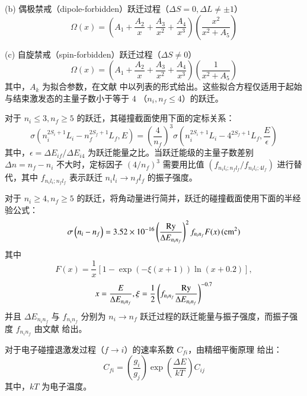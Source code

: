 (b) 偶极禁戒（dipole-forbidden）跃迁过程（$\Delta S=0, \Delta L\neq\pm 1$）
\begin{equation}
    \Omega(x)=\left(A_1+\frac{A_2}{x}+\frac{A_3}{x^2}+\frac{A_4}{x^3}\right)\left(\frac{x^2}{x^2+A_5}\right)
\end{equation}

(c) 自旋禁戒（spin-forbidden）跃迁过程（$\Delta S\neq0$）
\begin{equation}
    \Omega(x)=\left(A_1+\frac{A_2}{x}+\frac{A_3}{x^2}+\frac{A_4}{x^3}\right)\left(\frac{1}{x^2+A_5}\right)
\end{equation}
其中，$A_k$ 为拟合参数，在文献  中以列表的形式给出。这些拟合方程仅适用于起始与结束激发态的主量子数小于等于 $4$ （$n_i, n_f\le4$）的跃迁。

对于 $n_i\leq3, n_f\geq5$ 的跃迁，其碰撞截面使用下面的定标关系：
\begin{equation}
    \sigma\left(n_i^{2S_i+1}L_i-n_f^{2S_f+1}L_f, E\right)=
    \left(\frac{4}{n_f}\right)^3\sigma\left(n_i^{2S_i+1}L_i-4^{2S_f+1}L_f,\frac{E}{\epsilon}\right)
\end{equation}
其中，$\epsilon=\Delta E_{if}/\Delta E_{i4}$ 为跃迁能量之比。当跃迁能级的主量子数差别 $\Delta n=n_f-n_i$ 不大时，定标因子 $(4/n_f)^3$ 需要用比值 $(f_{n_il_i;n_fl_f}/f_{n_il_i;4l_f})$ 进行替代，其中 $f_{n_il_i;n_fl_f}$ 表示跃迁 $n_il_i\to n_fl_f$ 的振子强度。

对于 $n_i\geq4,n_f\geq5$ 的跃迁，将角动量进行简并，跃迁的碰撞截面使用下面的半经验公式：
\begin{equation}
    \sigma\left(n_i-n_f\right)=
    3.52\times10^{-16}\left(\frac{{\rm Ry}}{\Delta E_{n_in_f}}\right)^2f_{n_in_f}F(x)\,({\rm cm}^2)
\end{equation}
其中
\begin{equation}
    F(x)=\frac{1}{x}[1-\exp(-\xi(x+1))\ln(x+0.2)],
\end{equation}
\begin{equation}
    x=\frac{E}{\Delta E_{n_in_f}},\xi=\frac{1}{2}\left(f_{n_in_f}\frac{\rm Ry}{\Delta E_{n_in_f}}\right)^{-0.7}
\end{equation}
并且 $\Delta E_{n_in_f}$ 与 $f_{n_in_f}$ 分别为 $n_i\to n_f$ 跃迁过程的跃迁能量与振子强度，而振子强度 $f_{n_in_f}$ 由文献  给出。

对于电子碰撞退激发过程（$f\to i$）的速率系数 $C_{fi}$，由精细平衡原理\cite{Lieberman2005-book} 给出\cite{Burgess1992:collisionalstrength}：
\begin{equation}
    C_{fi}=\left(\frac{g_i}{g_j}\right)\exp\left(\frac{\Delta E}{kT}\right)C_{ij}
\end{equation}
其中，$kT$ 为电子温度。

